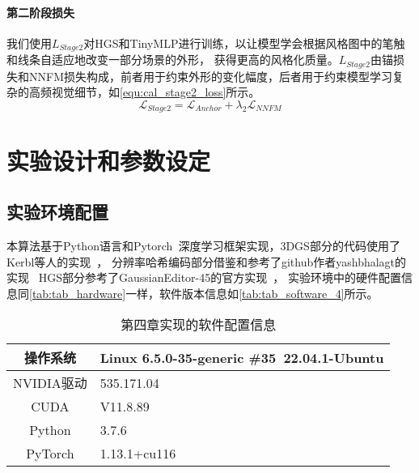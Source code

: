 \paragraph{第二阶段损失}
我们使用$L_{Stage2}$对HGS和TinyMLP进行训练，以让模型学会根据风格图中的笔触和线条自适应地改变一部分场景的外形，
获得更高的风格化质量。$L_{Stage2}$由锚损失和NNFM损失构成，前者用于约束外形的变化幅度，后者用于约束模型学习复杂的高频视觉细节，如\autoref{equ:cal_stage2_loss}所示。
\begin{equation}
    \label{equ:cal_stage2_loss}
    \mathcal{L}_{Stage2}=\mathcal{L}_{Anchor}+\lambda_2\mathcal{L}_{NNFM}
\end{equation}
\section{实验设计和参数设定}    
\subsection{实验环境配置}
本算法基于Python语言和Pytorch~\cite{paszke2019pytorch}深度学习框架实现，3DGS部分的代码使用了Kerbl等人的实现~\cite{3dgsrepo}，
分辨率哈希编码部分借鉴和参考了github作者yashbhalagt的实现~\cite{ingp-torchrepo}
HGS部分参考了GaussianEditor-45的官方实现~\cite{gaussianeditorrepo}，
实验环境中的硬件配置信息同\autoref{tab:tab_hardware}一样，软件版本信息如\autoref{tab:tab_software_4}所示。
\begin{table}[htbp]
    \caption{\label{tab:tab_software_4}第四章实现的软件配置信息}
    \begin{tabularx}{\linewidth}{c|X<{\centering}}
        \hline
        操作系统 & Linux 6.5.0-35-generic \#35~22.04.1-Ubuntu \\ \hline
        NVIDIA驱动 & 535.171.04 \\ \hline
        CUDA & V11.8.89 \\ \hline
        Python & 3.7.6 \\ \hline
        PyTorch & 1.13.1+cu116 \\ \hline
    \end{tabularx}
\end{table}

